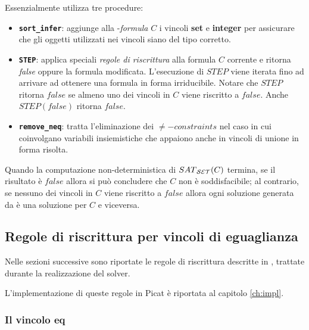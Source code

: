 \documentclass[12pt,a4paper,openright]{book} %
\begin{document}
Essenzialmente  utilizza tre procedure:

\begin{itemize}
	\item \textbf{\texttt{sort\_infer}}: aggiunge alla
          \calset{}-\textit{formula} $C$ i vincoli \textbf{set} e
          \textbf{integer} per assicurare che gli oggetti utilizzati
          nei vincoli siano del tipo corretto.

	\item \textbf{\texttt{STEP}}: applica speciali \textit{regole
          di riscrittura} alla formula $C$ corrente e ritorna
          \textit{false} oppure la formula modificata. L'esecuzione di
          $STEP$ viene iterata fino ad arrivare ad ottenere una
          formula in forma irriducibile. Notare che $STEP$ ritorna
          $false$ se almeno uno dei vincoli in $C$ viene riscritto a
          $false$. Anche $STEP(false)$ ritorna $false$.

	\item \textbf{\texttt{remove\_neq}}: tratta l'eliminazione dei
          $\neq-constraints$ nel caso in cui coinvolgano variabili
          insiemistiche che appaiono anche in vincoli di unione in
          forma risolta.
\end{itemize}

Quando la computazione non-deterministica di $SAT\textsubscript{\ensuremath{\mathcal{S}}\ensuremath{\mathcal{E}}\ensuremath{\mathcal{T}}}{}(C)$ termina,
se il risultato è $false$ allora si può concludere che $C$ non è
soddisfacibile; al contrario, se nessuno dei vincoli in $C$ viene
riscritto a $false$ allora ogni soluzione generata da \satset{} è una
soluzione per $C$ e viceversa.

\subsection{Regole di riscrittura per vincoli di eguaglianza}
\label{subsec:clpbasedlang_lset_rewriteeq}


Nelle sezioni successive sono riportate le regole di riscrittura
descritte in \cite{Rossi18}, trattate durante la realizzazione del
solver.

L'implementazione di queste regole in Picat è riportata al capitolo
\ref{ch:impl}.

\subsubsection{Il vincolo eq}
\end{document}
